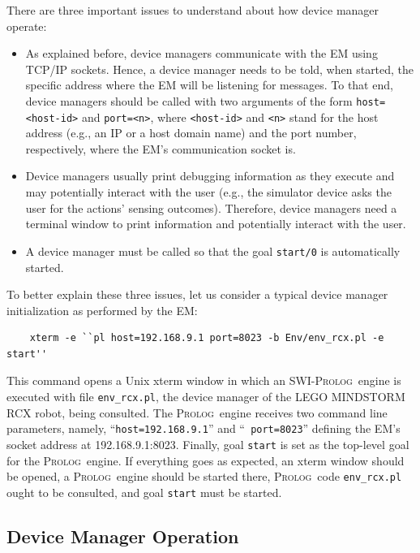 \documentclass[11pt]{article}
\newcommand{\Prolog}{\mbox{\textsc{Prolog}}}
\begin{document}
There are three important issues to understand about how device manager operate:
\begin{itemize}
\item As explained before, device managers communicate with the EM using TCP/IP
sockets. Hence,  a device manager needs to be told, when started, the specific
address where the EM will be listening for messages. 
%
To that end, device managers should be called with two arguments of the form
\texttt{host=<host-id>} and \texttt{port=<n>}, where \texttt{<host-id>} and
\texttt{<n>} stand for the host address (e.g., an IP or a host domain name) and
the port number, respectively, where the EM's communication socket is.

\item Device managers usually print debugging information as they execute and
may potentially interact with the user (e.g., the simulator device asks the
user for the actions' sensing outcomes). Therefore, device managers need a
terminal window to print information and potentially interact with the user.

\item A device manager must be called so that the goal \texttt{start/0} is
automatically started.
\end{itemize}
 
To better explain these three issues, let us consider a typical device manager
initialization as performed by the EM:
%
\begin{verbatim}
    xterm -e ``pl host=192.168.9.1 port=8023 -b Env/env_rcx.pl -e start''
\end{verbatim}
%
This command opens a Unix xterm window in which an SWI-\Prolog\ engine is
executed with file \texttt{env\_rcx.pl}, the device manager of the LEGO
MINDSTORM RCX robot, being consulted. The \Prolog\ engine receives two
command line parameters, namely, ``\texttt{host=192.168.9.1}'' and ``\texttt{
port=8023}'' defining the EM's socket address at 192.168.9.1:8023. Finally,
goal \texttt{start} is set as the top-level goal for the \Prolog\ engine.
%
If everything goes as expected, an xterm window should be opened, a \Prolog\
engine should be started there, \Prolog\ code \texttt{env\_rcx.pl} ought to be
consulted, and goal \texttt{start} must be started.


\subsection{Device Manager Operation}
\end{document}
